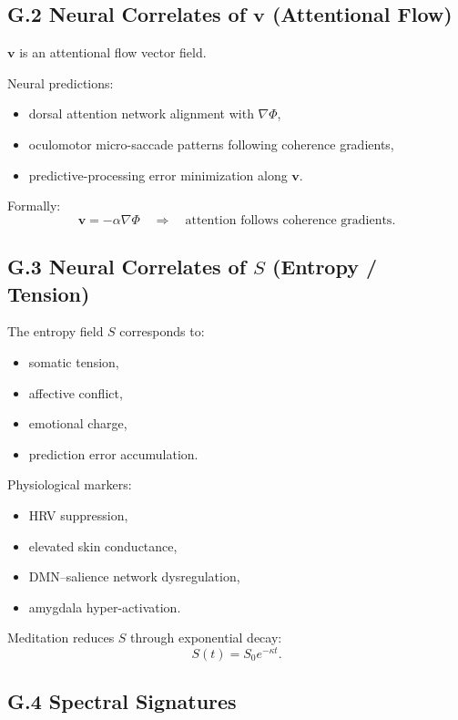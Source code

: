 \documentclass[12pt]{article}
\begin{document}
\subsection*{G.2 Neural Correlates of $\mathbf{v}$ (Attentional Flow)}

$\mathbf{v}$ is an attentional flow vector field.

Neural predictions:

\begin{itemize}
    \item dorsal attention network alignment with $\nabla\Phi$,
    \item oculomotor micro-saccade patterns following coherence gradients,
    \item predictive-processing error minimization along $\mathbf{v}$.
\end{itemize}

Formally:
\[
\mathbf{v} = -\alpha \nabla\Phi
\quad\Rightarrow\quad
\text{attention follows coherence gradients}.
\]

\subsection*{G.3 Neural Correlates of $S$ (Entropy / Tension)}

The entropy field $S$ corresponds to:
\begin{itemize}
    \item somatic tension,
    \item affective conflict,
    \item emotional charge,
    \item prediction error accumulation.
\end{itemize}

Physiological markers:
\begin{itemize}
    \item HRV suppression,
    \item elevated skin conductance,
    \item DMN--salience network dysregulation,
    \item amygdala hyper-activation.
\end{itemize}

Meditation reduces $S$ through exponential decay:
\[
S(t) = S_0 e^{-\kappa t}.
\]

\subsection*{G.4 Spectral Signatures}
\end{document}
